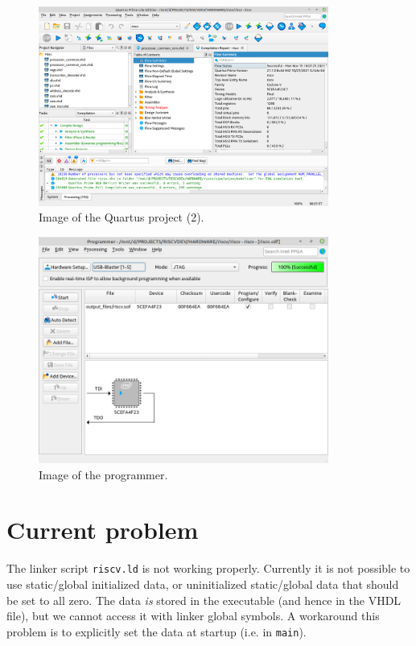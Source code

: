 \documentclass[12pt]{article}
\begin{document}
\begin{itemize}
\begin{figure}[!ht]
\centering
\includegraphics[width=0.85\textwidth]{quartus2}
\caption{Image of the Quartus project (2).}
\label{quartus2}
\end{figure}

\begin{figure}[!ht]
\centering
\includegraphics[width=0.85\textwidth]{programmer}
\caption{Image of the programmer.}
\label{programmer}
\end{figure}

\end{itemize}

\section{Current problem}
The linker script \texttt{riscv.ld} is not working properly. Currently it is not possible to use static/global initialized data, or uninitialized static/global data that should be set to all zero. The data \emph{is} stored in the executable (and hence in the VHDL file), but we cannot access it with linker global symbols. A workaround this problem is to explicitly set the data at startup (i.e. in \texttt{main}).
\end{document}
